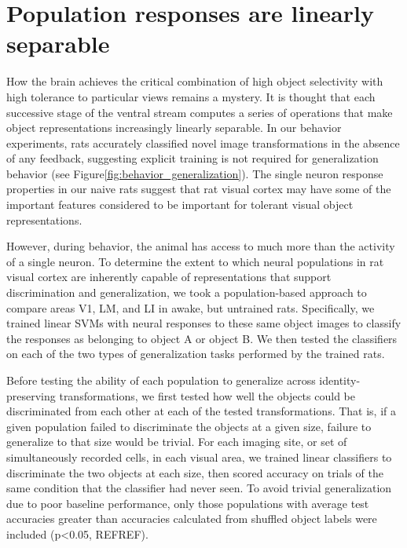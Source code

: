 \section{Population responses are linearly separable}
How the brain achieves the critical combination of high object selectivity with high tolerance to particular views remains a mystery. It is thought that each successive stage of the ventral stream computes a series of operations that make object representations increasingly linearly separable. In our behavior experiments, rats accurately classified novel image transformations in the absence of any feedback, suggesting explicit training is not required for generalization behavior (see Figure\ref{fig:behavior_generalization}). The single neuron response properties in our naive rats suggest that rat visual cortex may have some of the important features considered to be important for tolerant visual object representations.

However, during behavior, the animal has access to much more than the activity of a single neuron. To determine the extent to which neural populations in rat visual cortex are inherently capable of representations that support discrimination and generalization, we took a population-based approach to compare areas V1, LM, and LI in awake, but untrained rats. Specifically, we trained linear SVMs with neural responses to these same object images to classify the responses as belonging to object A or object B\cite{Hung2005, Li2009, Rust2010, etc}. We then tested the classifiers on each of the two types of generalization tasks performed by the trained rats. 

Before testing the ability of each population to generalize across identity-preserving transformations, we first tested how well the objects could be discriminated from each other at each of the tested transformations. That is, if a given population failed to discriminate the objects at a given size, failure to generalize to that size would be trivial. For each imaging site, or set of simultaneously recorded cells, in each visual area, we trained linear classifiers to discriminate the two objects at each size, then scored accuracy on trials of the same condition that the classifier had never seen. To avoid trivial generalization due to poor baseline performance, only those populations with average test accuracies greater than accuracies calculated from shuffled object labels were included (p<0.05, REFREF). 

